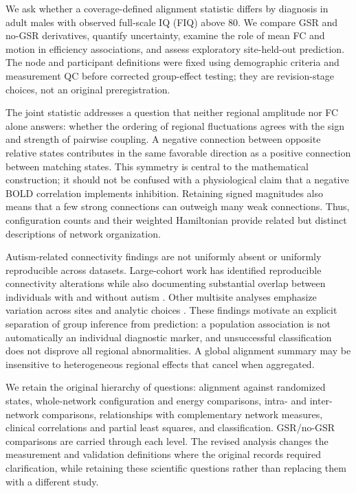 \documentclass[10pt,letterpaper]{article}
\begin{document}
We ask whether a coverage-defined alignment statistic differs by
diagnosis in adult males with observed full-scale IQ (FIQ) above 80. We compare
GSR and no-GSR derivatives, quantify uncertainty, examine the role of mean FC and
motion in efficiency associations, and assess exploratory site-held-out prediction.
The node and participant definitions were fixed using demographic criteria
and measurement QC before corrected group-effect testing; they are revision-stage
choices, not an original preregistration.

The joint statistic addresses a question that neither regional amplitude nor FC
alone answers: whether the ordering of regional fluctuations agrees with the
sign and strength of pairwise coupling. A negative connection between opposite
relative states contributes in the same favorable direction as a positive
connection between matching states. This symmetry is central to the mathematical
construction; it should not be confused with a physiological claim that a
negative BOLD correlation implements inhibition. Retaining signed magnitudes also
means that a few strong connections can outweigh many weak connections. Thus,
configuration counts and their weighted Hamiltonian provide related but distinct
descriptions of network organization.

Autism-related connectivity findings are not uniformly absent or uniformly
reproducible across datasets. Large-cohort work has identified reproducible
connectivity alterations while also documenting substantial overlap between
individuals with and without autism \cite{Holiga2019revision}. Other multisite
analyses emphasize variation across sites and analytic choices
\cite{King2019revision}. These findings motivate an explicit separation of group
inference from prediction: a population association is not automatically an
individual diagnostic marker, and unsuccessful classification does not disprove
all regional abnormalities. A global alignment summary may be insensitive to
heterogeneous regional effects that cancel when aggregated.

We retain the original hierarchy of questions: alignment against randomized
states, whole-network configuration and energy comparisons, intra- and
inter-network comparisons, relationships with complementary network measures,
clinical correlations and partial least squares, and classification. GSR/no-GSR
comparisons are carried through each level. The revised analysis changes the
measurement and validation definitions where the original records required
clarification, while retaining these scientific questions rather than replacing
them with a different study.
\end{document}
